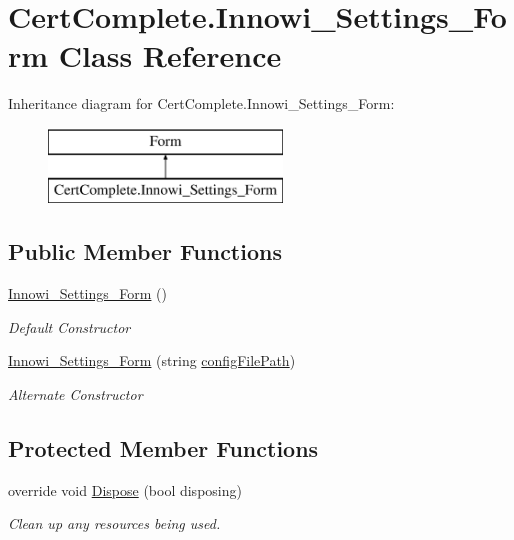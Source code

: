 \hypertarget{class_cert_complete_1_1_innowi___settings___form}{}\section{Cert\+Complete.\+Innowi\+\_\+\+Settings\+\_\+\+Form Class Reference}
\label{class_cert_complete_1_1_innowi___settings___form}
Inheritance diagram for Cert\+Complete.\+Innowi\+\_\+\+Settings\+\_\+\+Form\+:\begin{figure}[H]
\begin{center}
\leavevmode
\includegraphics[height=2.000000cm]{class_cert_complete_1_1_innowi___settings___form}
\end{center}
\end{figure}
\subsection*{Public Member Functions}
\begin{DoxyCompactItemize}
\item 
\mbox{\hyperlink{class_cert_complete_1_1_innowi___settings___form_aa03b9b85e077f22dca0c0755f0a5cae5}{Innowi\+\_\+\+Settings\+\_\+\+Form}} ()
\begin{DoxyCompactList}\small\item\em Default Constructor \end{DoxyCompactList}\item 
\mbox{\hyperlink{class_cert_complete_1_1_innowi___settings___form_a102eb9367ddc6288899edece0dcfe2b9}{Innowi\+\_\+\+Settings\+\_\+\+Form}} (string \mbox{\hyperlink{class_cert_complete_1_1_innowi___settings___form_a68af5f8c7ecf4d3385a3457068bf69d6}{config\+File\+Path}})
\begin{DoxyCompactList}\small\item\em Alternate Constructor \end{DoxyCompactList}\end{DoxyCompactItemize}
\subsection*{Protected Member Functions}
\begin{DoxyCompactItemize}
\item 
override void \mbox{\hyperlink{class_cert_complete_1_1_innowi___settings___form_a50bea4f2e035043585d21c458e1fc23f}{Dispose}} (bool disposing)
\begin{DoxyCompactList}\small\item\em Clean up any resources being used. \end{DoxyCompactList}\end{DoxyCompactItemize}
